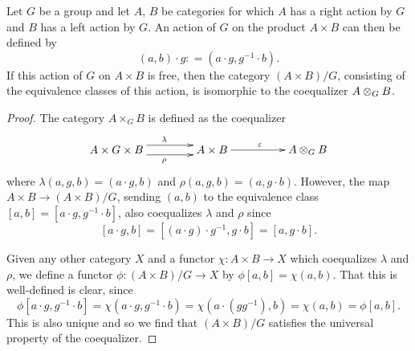 \begin{lem}\label{lem:coeq-lem}
Let $G$ be a group and let $A$, $B$ be categories for which $A$ has a right action by $G$ and $B$ has a left action by $G$. An action of $G$ on the product $A \times B$ can then be defined by
    \[
        (a,b) \cdot g \colon = \left(a \cdot g, g^{-1} \cdot b\right).
    \]
If this action of $G$ on $A \times B$ is free, then the category $(A \times B)/G$, consisting of the equivalence classes of this action, is isomorphic to the coequalizer $\coeqb{A}{B}{G}$.
\end{lem}
\begin{proof}
The category $A \times_G B$ is defined as the coequalizer
    \[
        \xy
            (0,0)*+{A \times G \times B}="00";
            (30,0)*+{A \times B}="10";
            (60,0)*+{\coeqb{A}{B}{G}}="20";
            {\ar@<1ex>^{\lambda} "00" ; "10"};
            {\ar@<-1ex>_{\rho} "00" ; "10"};
            {\ar^{\varepsilon} "10" ; "20"};
        \endxy
    \]
where $\lambda(a,g,b) = (a \cdot g, b)$ and $\rho(a,g,b) = (a, g \cdot b)$. However, the map $A \times B \rightarrow (A \times B)/G$, sending $(a,b)$ to the equivalence class $[a,b] = [a \cdot g, g^{-1} \cdot b]$, also coequalizes $\lambda$ and $\rho$ since
    \[
        [a \cdot g, b] = \left[(a \cdot g) \cdot g^{-1}, g \cdot b\right] = [a, g \cdot b].
    \]

Given any other category $X$ and a functor $\chi \colon A \times B \rightarrow X$ which coequalizes $\lambda$ and $\rho$, we define a functor $\phi \colon (A \times B)/G \rightarrow X$ by $\phi[a,b] = \chi(a,b)$. That this is well-defined is clear, since
    \[
        \phi\left[a \cdot g, g^{-1} \cdot b\right] = \chi\left(a \cdot g, g^{-1} \cdot b\right) = \chi\left(a \cdot \left(gg^{-1}\right), b\right) = \chi(a, b) = \phi[a,b].
    \]
This is also unique and so we find that $(A \times B)/G$ satisfies the universal property of the coequalizer.
\end{proof}




